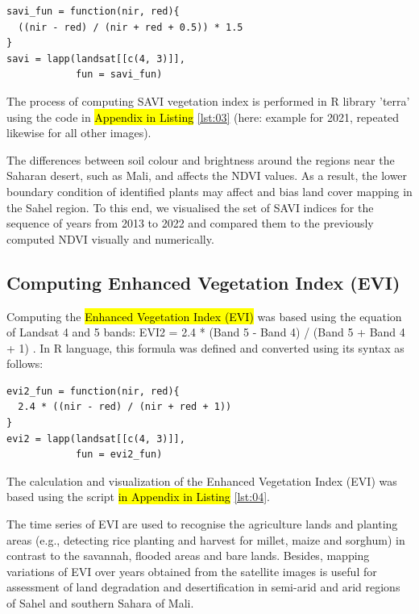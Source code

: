 \documentclass[12pt,a4paper,oneside]{article}
\def \newpar{\vspace{6pt}}
\begin{document}
\begin{small}
\begin{verbatim}
savi_fun = function(nir, red){
  ((nir - red) / (nir + red + 0.5)) * 1.5
}
savi = lapp(landsat[[c(4, 3)]],
            fun = savi_fun)
\end{verbatim}
\end{small}

\newpar The process of computing SAVI vegetation index is performed in R library 'terra' using the code in \hl{Appendix in Listing} \ref{lst:03} (here: example for 2021, repeated likewise for all other images).

\newpar The differences between soil colour and brightness around the regions near the Saharan desert, such as Mali, and affects the NDVI values. As a result, the lower boundary condition of identified plants may affect and bias land cover mapping in the Sahel region. To this end, we visualised the set of SAVI indices for the sequence of years from 2013 to 2022 and compared them to the previously computed NDVI visually and numerically.

\subsection*{Computing Enhanced Vegetation Index (EVI)}

\newpar Computing the \hl{Enhanced Vegetation Index (EVI)} was based using the equation of Landsat 4 and 5 bands: EVI2 = 2.4 * (Band 5 - Band 4) / (Band 5 + Band 4 + 1) \citep{HUETE2002195}. In R language, this formula was defined and converted using its syntax as follows:  

\begin{small}
\begin{verbatim}
evi2_fun = function(nir, red){
  2.4 * ((nir - red) / (nir + red + 1))
}
evi2 = lapp(landsat[[c(4, 3)]],
            fun = evi2_fun)
\end{verbatim}
\end{small}

\newpar The calculation and visualization of the Enhanced Vegetation Index (EVI) was based using the script \hl{in Appendix in Listing} \ref{lst:04}.

\newpar The time series of EVI are used to recognise the agriculture lands and planting areas (e.g., detecting rice planting and harvest for millet, maize and sorghum) in contrast to the savannah, flooded areas and bare lands. Besides, mapping variations of EVI over years obtained from the satellite images is useful for assessment of land degradation and desertification in semi-arid and arid regions of Sahel and southern Sahara of Mali. 
\end{document}
